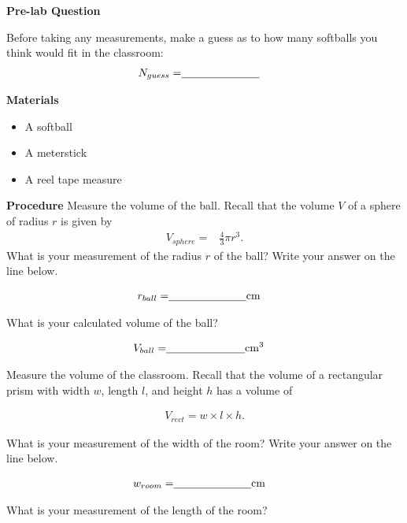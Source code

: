 \textbf{\Large Pre-lab Question}
\qsp
\begin{questions}

\question[1] Before taking any measurements, make a guess as to how many softballs you think would fit in the classroom:
\qsp
\begin{align*}
N_{guess} =& \underline{\hspace{2.5cm}}
\end{align*}

\textbf{\Large Materials}
\qsp
\begin{itemize}
\item A softball
\item A meterstick
\item A reel tape measure
\end{itemize}
\qsp
\textbf{\Large Procedure}
\qsp
\question[2] Measure the volume of the ball. Recall that the volume $V$ of a sphere of radius $r$ is given by 
\begin{align*}
V_{sphere} =& \frac{4}{3}\pi r^3.
\end{align*}
 What is your measurement of the radius $r$ of the ball? Write your answer on the line below.
\qsp

\begin{align*}
r_{ball} =& \underline{\hspace{2.5cm}}\SI{}{cm}
\end{align*} 

What is your calculated volume of the ball? 
\qsp 

\begin{align*}
V_{ball} =& \underline{\hspace{2.5cm}}\SI{}{cm^3}
\end{align*} 

\question[2] Measure the volume of the classroom. Recall that the volume of a rectangular prism with width $w$, length $l$, and height $h$ has a volume of

\begin{align*}
V_{rect} = w\times l\times h.
\end{align*}

What is your measurement of the width of the room? Write your answer on the line below.
\qsp

\begin{align*}
w_{room} =& \underline{\hspace{2.5cm}}\SI{}{cm}
\end{align*} 

What is your measurement of the length of the room? 
\qsp


\end{questions}
